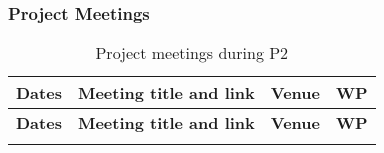 \subsubsection*{Project Meetings}

\begin{longtable}{|L{0.18\textwidth}|C{0.48\textwidth}|C{0.12\textwidth}|C{0.10\textwidth}|}
\caption{Project meetings during P2}
\label{tab:usp-wp2}
    \\ \hline
    {\bf Dates} & {\bf Meeting title and link} &
     {\bf Venue} & {\bf WP} 
    \\ \hline
    \endfirsthead
    \hline
        {\bf Dates} & {\bf Meeting title and link} &
     {\bf Venue} & {\bf WP} 
  \\ \hline
    \endhead
    \hline
    \endfoot
    

\end{longtable}
